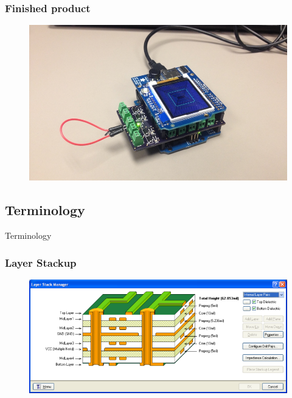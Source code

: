 \documentclass{beamer}
\begin{document}
\begin{frame}
\frametitle{Finished product}
\begin{figure}
\includegraphics[width=0.8\linewidth]{ovenboard3-final.png}
\end{figure}
\end{frame}


\subsection{Terminology}

\begin{frame}
\Huge{\centerline{Terminology}}
\end{frame}


\begin{frame}
\frametitle{Layer Stackup}

\begin{figure}
\includegraphics[width=0.8\linewidth]{stackup.png}
\end{figure}

\end{frame}
\end{document}
